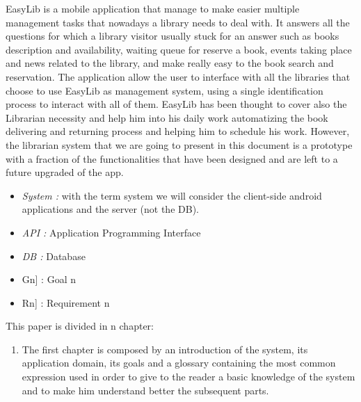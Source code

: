 \vspace*{-5mm}



EasyLib is a mobile application that manage to make easier multiple management tasks that nowadays a library needs to deal with. It answers all the questions for which a library visitor usually stuck for an answer such as books description and availability, waiting queue for reserve a book, events taking place and news related to the library, and make really easy to the book search and reservation. The application allow the user to interface with all the libraries that choose to use EasyLib as management system, using a single identification process to interact with all of them.
EasyLib has been thought to cover also the Librarian necessity and help him into his daily work automatizing the book delivering and returning process and helping him to schedule his work. However, the librarian system that we are going to present in this document is a prototype with a fraction of the functionalities that have been designed and are left to a future upgraded of the app.


\begin{itemize}
	\item \emph{System :} with the term system we will consider the client-side android applications and the server (not the DB).
\end{itemize}

\begin{itemize}
	\setlength{\leftskip}{0.5cm}
	\item \emph{API :} Application Programming Interface
	\item \emph{DB :} Database
\end{itemize}

\begin{itemize}
	\setlength{\leftskip}{0.5cm}
	\item \lbrack Gn] : Goal n
	\item \lbrack Rn] : Requirement n
\end{itemize}

This paper is divided in n chapter:
\begin{enumerate}
	\setlength{\leftskip}{0.5cm}
	\item The first chapter is composed by an introduction of the system, its application domain, its goals and a glossary containing the most common expression used in order to give to the reader a basic knowledge of the system and to make him understand better the subsequent parts.
	
	
\end{enumerate}